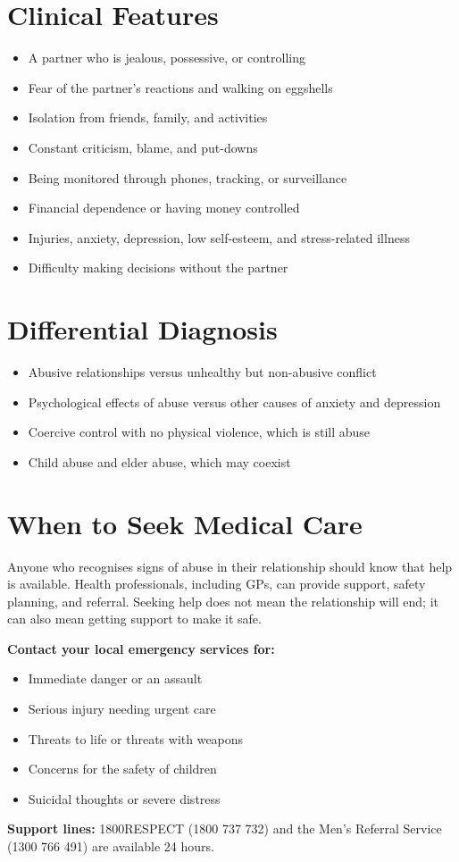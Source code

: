 \section*{Clinical Features}
\begin{itemize}
    \item A partner who is jealous, possessive, or controlling
    \item Fear of the partner's reactions and walking on eggshells
    \item Isolation from friends, family, and activities
    \item Constant criticism, blame, and put-downs
    \item Being monitored through phones, tracking, or surveillance
    \item Financial dependence or having money controlled
    \item Injuries, anxiety, depression, low self-esteem, and stress-related illness
    \item Difficulty making decisions without the partner
\end{itemize}

\section*{Differential Diagnosis}
\begin{itemize}
    \item Abusive relationships versus unhealthy but non-abusive conflict
    \item Psychological effects of abuse versus other causes of anxiety and depression
    \item Coercive control with no physical violence, which is still abuse
    \item Child abuse and elder abuse, which may coexist
\end{itemize}

\section*{When to Seek Medical Care}
Anyone who recognises signs of abuse in their relationship should know that help is available. Health professionals, including GPs, can provide support, safety planning, and referral. Seeking help does not mean the relationship will end; it can also mean getting support to make it safe.

\textbf{Contact your local emergency services for:}
\begin{itemize}
    \item Immediate danger or an assault
    \item Serious injury needing urgent care
    \item Threats to life or threats with weapons
    \item Concerns for the safety of children
    \item Suicidal thoughts or severe distress
\end{itemize}
\textbf{Support lines:} 1800RESPECT (1800 737 732) and the Men's Referral Service (1300 766 491) are available 24 hours.

